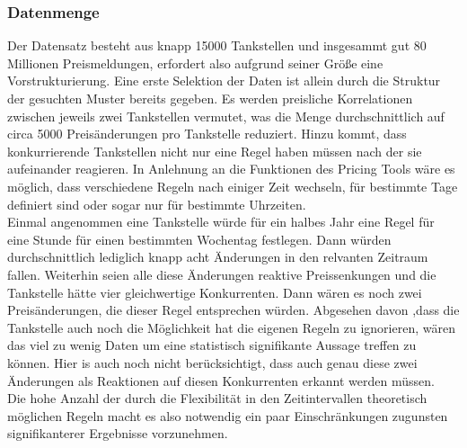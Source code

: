 \documentclass[12pt,a4paper,bibliography=totocnumbered,listof=totocnumbered]{scrartcl}
\begin{document}
\subsubsection{Datenmenge}
Der Datensatz besteht aus knapp 15000 Tankstellen und insgesammt gut 80 Millionen Preismeldungen, erfordert also aufgrund seiner Größe eine Vorstrukturierung. Eine erste Selektion der Daten ist allein durch die Struktur der gesuchten Muster bereits gegeben. Es werden preisliche Korrelationen zwischen jeweils zwei Tankstellen vermutet, was die Menge durchschnittlich auf  circa 5000 Preisänderungen pro Tankstelle reduziert. Hinzu kommt, dass konkurrierende Tankstellen nicht nur eine Regel haben müssen nach der sie aufeinander reagieren. In Anlehnung an die Funktionen des Pricing Tools wäre es möglich, dass verschiedene Regeln nach einiger Zeit wechseln, für bestimmte Tage definiert sind oder sogar nur für bestimmte Uhrzeiten.\\
Einmal angenommen eine Tankstelle würde für ein halbes Jahr eine Regel für eine Stunde für einen bestimmten Wochentag festlegen. Dann würden durchschnittlich lediglich knapp acht Änderungen in den relvanten Zeitraum fallen. Weiterhin seien alle diese Änderungen reaktive Preissenkungen und die Tankstelle hätte vier gleichwertige Konkurrenten. Dann wären es noch zwei Preisänderungen, die dieser Regel entsprechen würden. Abgesehen davon ,dass die Tankstelle auch noch die Möglichkeit hat die eigenen Regeln zu ignorieren, wären das viel zu wenig Daten um eine statistisch signifikante Aussage treffen zu können. Hier is auch noch nicht berücksichtigt, dass auch genau diese zwei Änderungen als Reaktionen auf diesen Konkurrenten erkannt werden müssen.\\
Die hohe Anzahl der durch die Flexibilität in den Zeitintervallen theoretisch möglichen Regeln macht es also notwendig ein paar Einschränkungen zugunsten signifikanterer Ergebnisse vorzunehmen.

\end{document}
